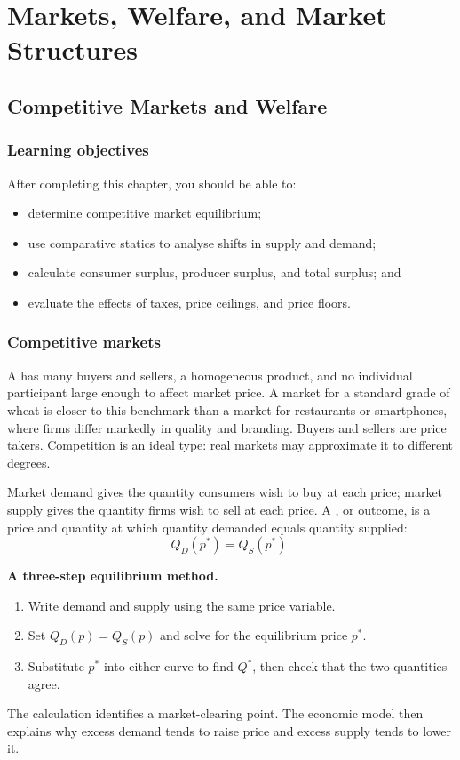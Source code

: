 \part{Markets, Welfare, and Market Structures}

\chapter{Competitive Markets and Welfare}
\label{chap:competition}

\section{Learning objectives}

After completing this chapter, you should be able to:
\begin{itemize}
  \item determine competitive market equilibrium;
  \item use comparative statics to analyse shifts in supply and demand;
  \item calculate consumer surplus, producer surplus, and total surplus; and
  \item evaluate the effects of taxes, price ceilings, and price floors.
\end{itemize}

\section{Competitive markets}

A  has many buyers and sellers, a homogeneous
product, and no individual participant large enough to affect market price.
A market for a standard grade of wheat is closer to this benchmark than a
market for restaurants or smartphones, where firms differ markedly in quality
and branding. Buyers and sellers are price takers. Competition is an ideal
type: real markets may approximate it to different degrees.

Market demand gives the quantity consumers wish to buy at each price; market
supply gives the quantity firms wish to sell at each price. A
, or  outcome, is a
price and quantity at which quantity demanded equals quantity supplied:
\[
Q_D(p^*)=Q_S(p^*).
\]

\begin{keyidea}
\textbf{A three-step equilibrium method.}
\begin{enumerate}
  \item Write demand and supply using the same price variable.
  \item Set $Q_D(p)=Q_S(p)$ and solve for the equilibrium price $p^*$.
  \item Substitute $p^*$ into either curve to find $Q^*$, then check that the
  two quantities agree.
\end{enumerate}
The calculation identifies a market-clearing point. The economic model then
explains why excess demand tends to raise price and excess supply tends to
lower it.
\end{keyidea}

